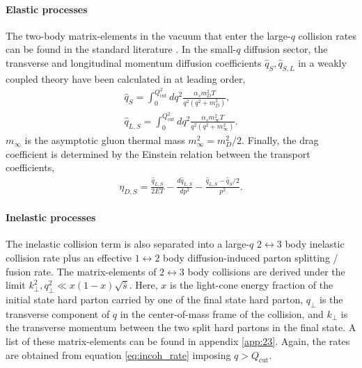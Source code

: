 \documentclass[aps, prc, reprint, amsmath, groupedaddress, nofootinbib]{revtex4-1}
\begin{document}
\paragraph{Elastic processes} The two-body matrix-elements in the vacuum that enter the large-$q$ collision rates can be found in the standard literature \cite{RevModPhys.59.465}.
In the small-$q$ diffusion sector, the transverse and longitudinal momentum diffusion coefficients $\hat{q}_S, \hat{q}_{S,L}$ in a weakly coupled theory have been calculated in \cite{Ghiglieri:2015ala} at leading order,
\begin{eqnarray}
\hat{q}_S = \int_0^{Q_{\textrm{cut}}^2} dq^2 \frac{\alpha_s m_D^2 T}{q^2 (q^2+m_D^2)},
\label{eq:qS} \\
\hat{q}_{L,S} = \int_0^{Q_{\textrm{cut}}^2} dq^2 \frac{\alpha_s m_\infty^2 T}{q^2 (q^2+m_\infty^2)}.
\label{eq:qSL}
\end{eqnarray}
$m_{\infty}$ is the asymptotic gluon thermal mass $m_{\infty}^2 = m_D^2/2$.
Finally, the drag coefficient is determined by the Einstein relation between the transport coefficients,
\begin{eqnarray}
\eta_{D,S} = \frac{\hat{q}_{L,S}}{2ET} - \frac{d\hat{q}_{L,S}}{dp^2} - \frac{\hat{q}_{L,S} - \hat{q}_S/2}{p^2}.
\end{eqnarray}

\paragraph{Inelastic processes} The inelastic collision term is also separated into a large-$q$ $2\leftrightarrow 3$ body inelastic collision rate plus an effective $1\leftrightarrow 2$ body diffusion-induced parton splitting / fusion rate.
The matrix-elements of $2\leftrightarrow 3$ body collisions are derived under the limit $k_\perp^2, q_\perp^2 \ll x(1-x)\sqrt{\hat{s}}$.
Here, $x$ is the light-cone energy fraction of the initial state hard parton carried by one of the final state hard parton, $q_\perp$ is the transverse component of $q$ in the center-of-mass frame of the collision, and $k_\perp$ is the transverse momentum between the two split hard partons in the final state. 
A list of these matrix-elements can be found in appendix \ref{app:23}.
Again, the rates are obtained from equation \ref{eq:incoh_rate} imposing $q>Q_{\textrm{cut}}$.
\end{document}
